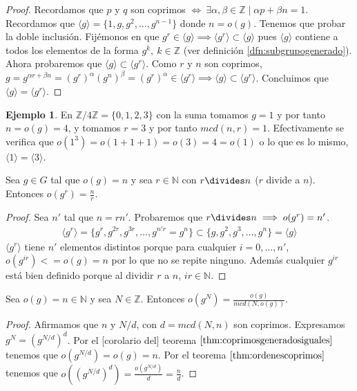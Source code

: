 \documentclass{book}
\theoremstyle{definition}
\newtheorem{ej}{Ejemplo}
\theoremstyle{remark}
\newcommand{\N}{\mathbb{N}}
\newcommand{\Z}{\mathbb{Z}}
\begin{document}
\begin{proof}
	Recordamos que $p$ y $q$ son coprimos $\iff\ \exists \alpha, \beta \in \Z \mid \alpha p + \beta n = 1$. Recordamos que $\langle g \rangle = \{1, g, g^2, \dots, g^{n-1}\}$ donde $n = o(g)$. Tenemos que probar la doble inclusión. Fijémonos en que $g^r \in \langle g \rangle \implies \langle g^r\rangle \subset \langle g \rangle$ pues $\langle g \rangle$ contiene a todos los elementos de la forma $g^k,\ k \in \Z$ (ver definición \ref{dfn:subgrupogenerado}). Ahora probaremos que $\langle g \rangle \subset \langle g^r \rangle$. Como $r$ y $n$ son coprimos, $g = g^{\alpha r + \beta n} = (g^r)^\alpha (g^n)^\beta = (g^r)^\alpha \in \langle g^r \rangle \implies \langle g \rangle \subset \langle g^r \rangle$. Concluimos que $\langle g \rangle = \langle g^r \rangle$.
\end{proof}

\begin{ej}
	En $\Z/4\Z = \{0, 1, 2, 3\}$ con la suma tomamos $g = 1$ y por tanto $n = o(g) = 4$, y tomamos $r = 3$ y por tanto $mcd(n, r) = 1$. Efectivamente se verifica que $o(1^3) = o(1+1+1) = o(3) = 4 = o(1)$ o lo que es lo mismo, $\langle 1 \rangle = \langle 3 \rangle$.
\end{ej}

\begin{thm}
	\label{thm:ordenescoprimos}
	Sea $g \in G$ tal que $o(g) = n$ y sea $r \in \N$ con $r \divides n$ ($r$ divide a $n$). Entonces $o(g^r) = \frac{n}{r}$.
\end{thm}

\begin{proof}
	Sea $n'$ tal que $n = rn'$. Probaremos que $r\divides n \implies o(g^r) = n'$.
	\begin{align*}
		\langle g^r \rangle = \{g^r, g^{2r}, g^{3r}, \dots, g^{n'r} = g^n\} \subset \{g, g^2, g^3, \dots, g^n\} = \langle g \rangle
	\end{align*}
	$\langle g^r \rangle$ tiene $n'$ elementos distintos porque para cualquier $i = 0,\dots, n'$, $o(g^{ir}) <= o(g) = n$ por lo que no se repite ninguno. Además cualquier $g^{ir}$ está bien definido porque al dividir $r$ a $n$, $ir \in \N$.
\end{proof}

\begin{thm}
	Sea $o(g) = n \in \N$ y sea $N \in \Z$. Entonces $o(g^N) = \frac{o(g)}{mcd(N, o(g))}$.
\end{thm}

\begin{proof}
	Afirmamos que $n$ y $N/d$, con $d = mcd(N,n)$ son coprimos. Expresamos $g^N = (g^{N/d})^d$. Por el [corolario del] teorema $\ref{thm:coprimosgeneradosiguales}$ tenemos que $o(g^{N/d}) = o(g) = n$. Por el teorema $\ref{thm:ordenescoprimos}$ tenemos que $o((g^{N/d})^d) = \frac{o(g^{N/d})}{d} = \frac{n}{d}$.
\end{proof}
\end{document}
